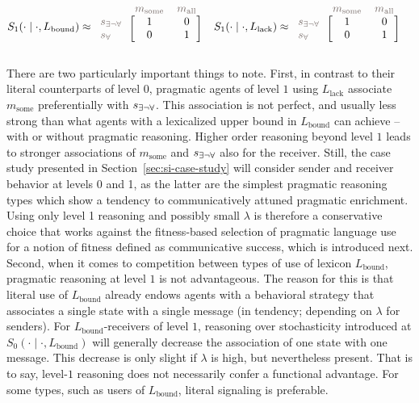 \documentclass[a4paper, 11pt]{article}
\theoremstyle{Satz}
\newcommand{\state}{\ensuremath{s}\xspace}		%
\newcommand{\mystate}[1]{\ensuremath{\state_{\text{#1}}}\xspace} %
\newcommand{\mylang}[1]{\ensuremath{L_{\text{#1}}}\xspace} %
\newcommand{\messg}{\ensuremath{m}\xspace}		%
\newcommand{\mymessg}[1]{\ensuremath{\messg_{\text{#1}}}\xspace} %
\newcommand{\ssome}{\mystate{\ensuremath{\exists\neg\forall}}}
\newcommand{\sall}{\mystate{\ensuremath{\forall}}}
\newcommand{\msome}{\mymessg{some}}
\newcommand{\mall}{\mymessg{all}}
\newcommand{\Lbound}{\mylang{bound}}
\newcommand{\Llack}{\mylang{lack}}
\newcommand{\mygray}[1]{{\textcolor{mygray}{#1}}}
\begin{document}
\begin{align*}
  S_1(\cdot \mid \cdot, \Lbound) & \approx \begin{blockarray}{lcc}
    & \mygray{\msome} & \mygray{\mall} \\
    \begin{block}{l[cc]}
      \mygray{\ssome} & 1 & 0 \\
      \mygray{\sall}  & 0 & 1 \\
    \end{block}
  \end{blockarray} &
  S_1(\cdot \mid \cdot, \Llack) & \approx \begin{blockarray}{lcc}
    & \mygray{\msome} & \mygray{\mall} \\
    \begin{block}{l[cc]}
      \mygray{\ssome} & 1 & 0 \\
      \mygray{\sall}  & 0 & 1 \\
    \end{block}
  \end{blockarray} 
\end{align*}


There are two particularly important things to note. First, in contrast to their literal counterparts of level $0$, pragmatic agents of level $1$ using $\Llack$ associate $\msome$ preferentially with $\ssome$. This association is not perfect, and usually less strong than what agents with a lexicalized upper bound in $\Lbound$ can achieve -- with or without pragmatic reasoning. Higher order reasoning beyond level $1$ leads to stronger associations of $\msome$ and $\ssome$ also for the receiver. Still, the case study presented in Section~\ref{sec:si-case-study} will consider
sender and receiver behavior at levels 0 and 1, as the latter are the simplest pragmatic reasoning types which show a tendency to communicatively attuned pragmatic enrichment. Using only level 1 reasoning and possibly small $\lambda$ is therefore a conservative choice that works against the fitness-based selection of pragmatic language use for a notion of fitness defined as communicative success, which is introduced next. Second, when it comes to competition between types of use of lexicon $\Lbound$, pragmatic reasoning at level $1$ is not advantageous. The reason for this is that literal use of $\Lbound$ already endows agents with a behavioral strategy that associates a single state with a single message (in tendency; depending on $\lambda$ for senders). For $\Lbound$-receivers of level $1$, reasoning over stochasticity introduced at $S_0( \cdot \mid \cdot, \Lbound)$ will generally decrease the association of one state with one message. This decrease is only slight if $\lambda$ is high, but nevertheless present. That is to say, level-$1$ reasoning does not necessarily confer a functional advantage. For some types, such as users of $\Lbound$, literal signaling is preferable.
\end{document}
